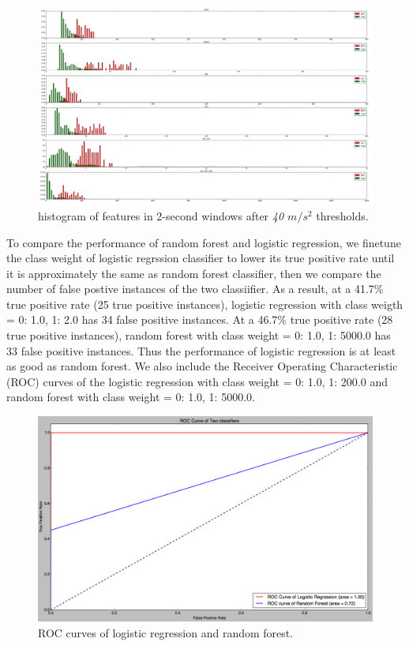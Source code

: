 \documentclass{soups}
\begin{document}
\begin{figure}[H]
\begin{center}
\includegraphics[width=1.0\columnwidth]{hist_features_after_win_size_1_2.png}
\end{center}
\caption{histogram of features in 2-second windows after \textit{40 $m/s^2$} thresholds.}
\end{figure}

To compare the performance of random forest and logistic regression, we finetune the class weight of logistic regrssion classifier to lower its true positive rate until it is approximately the same as random forest classifier, then we compare the number of false postive instances of the two classiifier. 
As a result, at a 41.7\% true positive rate (25 true positive instances), logistic regression with class weigth = {0: 1.0, 1: 2.0} has 34 false positive instances. 
At a 46.7\% true positive rate (28 true positive instances), random forest with class weight = {0: 1.0, 1: 5000.0} has 33 false positive instances. 
Thus the performance of logistic regression is at least as good as random forest.
We also include the Receiver Operating Characteristic (ROC) curves of the logistic regression with class weight = {0: 1.0, 1: 200.0} and random forest with class weight = {0: 1.0, 1: 5000.0}. 

\begin{figure}[H]
\begin{center}
\includegraphics[width=1.0\columnwidth]{roc_curves.png}
\end{center}
\caption{ROC curves of logistic regression and random forest.}
\end{figure}
\end{document}
